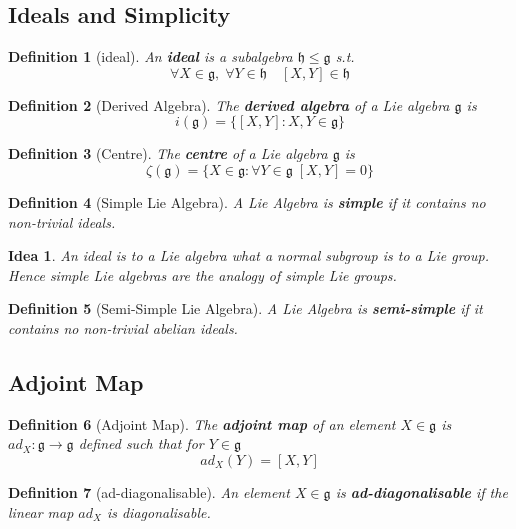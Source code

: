 \documentclass{article}
\newtheorem{definition}{Definition}[subsection]
\newtheorem*{idea}{Idea}
\newcommand{\bam}[1]{\textbf{#1}}
\newcommand{\mf}[1]{\mathfrak{#1}}
\newcommand{\comm}[2][]{\left[ #1, #2 \right]}
\newcommand{\set}[1]{\lbrace #1 \rbrace}
\begin{document}
\subsection{Ideals and Simplicity}

\begin{definition}[ideal]
An \bam{ideal} is a subalgebra $\mf{h} \leq \mf{g}$ s.t.
\[
\forall X\in\mf{g}, \; \forall Y\in\mf{h} \quad  \comm[X]{Y}\in\mf{h}
\]
\end{definition}

\begin{definition}[Derived Algebra]
The \bam{derived algebra} of a Lie algebra $\mf{g}$ is 
\[
i(\mf{g})=\set{\comm[X]{Y} : X,Y\in\mf{g}}
\]
\end{definition}

\begin{definition}[Centre]
The \bam{centre} of a Lie algebra $\mf{g}$ is 
\[
\zeta(\mf{g})=\set{X\in\mf{g} : \forall Y\in\mf{g} \; \comm[X]{Y}=0}
\]
\end{definition}

\begin{definition}[Simple Lie Algebra]
A Lie Algebra is \bam{simple} if it contains no non-trivial ideals.
\end{definition}

\begin{idea}
An ideal is to a Lie algebra what a normal subgroup is to a Lie group. Hence simple Lie algebras are the analogy of simple Lie groups.  
\end{idea}

\begin{definition}[Semi-Simple Lie Algebra]
A Lie Algebra is \bam{semi-simple} if it contains no non-trivial abelian ideals. 
\end{definition}

\subsection{Adjoint Map}

\begin{definition}[Adjoint Map]
The \bam{adjoint map} of an element $X\in\mf{g}$ is $ad_{X}:\mf{g}\to\mf{g}$ defined such that for $Y\in\mf{g}$
\[
ad_{X}\left(Y\right)=\comm[X]{Y}
\]
\end{definition}

\begin{definition}[ad-diagonalisable]
An element $X\in\mf{g}$ is \bam{ad-diagonalisable} if the linear map $ad_X$ is diagonalisable. 
\end{definition}
\end{document}

